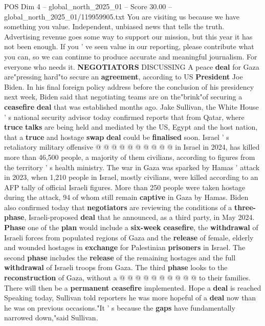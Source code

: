 \begin{textsample}{POS Dim 4 – global\_north\_2025\_01 – Score 30.00 – global\_north\_2025\_01/119959905.txt}  \label{ex:f4_pos_045}
You are visiting us because we have something you value.
Independent, unbiased news that tells the truth.
Advertising revenue goes some way to support our mission, but this year it has not been enough.
If you ' ve seen value in our reporting, please contribute what you can, so we can continue to produce accurate and meaningful journalism.
For everyone who needs it. \textbf{NEGOTIATORS} DISCUSSING A peace \textbf{deal} for Gaza are"pressing hard"to secure an \textbf{agreement}, according to US \textbf{President} Joe Biden.
In his final foreign policy address before the conclusion of his presidency next week, Biden said that negotiating teams are on the"brink"of securing a \textbf{ceasefire} \textbf{deal} that was established months ago.
Jake Sullivan, the White House ' s national security advisor today confirmed reports that from Qatar, where \textbf{truce} \textbf{talks} are being held and mediated by the US, Egypt and the host nation, that a \textbf{truce} and hostage \textbf{swap} \textbf{deal} could be \textbf{finalised} soon.
Israel ' s retaliatory military offensive @ @ @ @ @ @ @ @ @ @ in Israel in 2024, has killed more than 46,500 people, a majority of them civilians, according to figures from the territory ' s health ministry.
The war in Gaza was sparked by Hamas ' attack in 2023, when 1,210 people in Israel, mostly civilians, were killed according to an AFP tally of official Israeli figures.
More than 250 people were taken hostage during the attack, 94 of whom still remain \textbf{captive} in Gaza by Hamas.
Biden also confirmed today that \textbf{negotiators} are reviewing the conditions of a \textbf{three-phase}, Israeli-proposed \textbf{deal} that he announced, as a third party, in May 2024. \textbf{Phase} one of the \textbf{plan} would include a \textbf{six-week} \textbf{ceasefire}, the \textbf{withdrawal} of Israeli forces from populated regions of Gaza and the \textbf{release} of female, elderly and wounded hostages in \textbf{exchange} for Palestinian \textbf{prisoners} in Israel.
The second \textbf{phase} includes the \textbf{release} of the remaining hostages and the full \textbf{withdrawal} of Israeli troops from Gaza.
The third \textbf{phase} looks to the \textbf{reconstruction} of Gaza, without a @ @ @ @ @ @ @ @ @ @ to their families.
There will then be a \textbf{permanent} \textbf{ceasefire} implemented.
Hope a \textbf{deal} is reached Speaking today, Sullivan told reporters he was more hopeful of a \textbf{deal} now than he was on previous occasions."It ' s because the \textbf{gaps} have fundamentally narrowed down,"said Sullivan.

\end{textsample}
